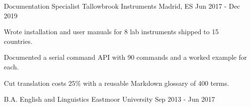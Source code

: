 \documentclass[11pt, a4paper]{awesome-cv}
\begin{document}
\begin{cventries}
  \cventry
    {Documentation Specialist} %
    {Tallowbrook Instruments} %
    {Madrid, ES} %
    {Jun 2017 - Dec 2019} %
    {
      \begin{cvitems} %
        \item {Wrote installation and user manuals for 8 lab instruments shipped to 15 countries.} %
        \item {Documented a serial command API with 90 commands and a worked example for each.} %
        \item {Cut translation costs 25\% with a reusable Markdown glossary of 400 terms.} %
      \end{cvitems}
    }

\end{cventries}


\begin{cventries}

  \cventry
    {B.A. English and Linguistics} %
    {Eastmoor University} %
    {} %
    {Sep 2013 - Jun 2017} %
    {}

\end{cventries}


\begin{cvskills}
\end{cvskills}
\end{document}
